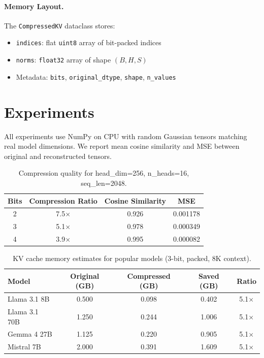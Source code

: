 \documentclass{article}
\begin{document}
\paragraph{Memory Layout.}
The \texttt{CompressedKV} dataclass stores:
\begin{itemize}
  \item \texttt{indices}: flat \texttt{uint8} array of bit-packed indices
  \item \texttt{norms}: \texttt{float32} array of shape $(B, H, S)$
  \item Metadata: \texttt{bits}, \texttt{original\_dtype}, \texttt{shape},
    \texttt{n\_values}
\end{itemize}

\section{Experiments}
\label{sec:experiments}

All experiments use NumPy on CPU with random Gaussian tensors matching
real model dimensions.  We report mean cosine similarity and MSE between
original and reconstructed tensors.

\begin{table}[h]
\centering
\caption{Compression quality for head\_dim=256, n\_heads=16, seq\_len=2048.}
\label{tab:quality}
\begin{tabular}{@{}cccc@{}}
\toprule
Bits & Compression Ratio & Cosine Similarity & MSE \\
\midrule
2 & 7.5$\times$ & 0.926 & 0.001178 \\
3 & 5.1$\times$ & 0.978 & 0.000349 \\
4 & 3.9$\times$ & 0.995 & 0.000082 \\
\bottomrule
\end{tabular}
\end{table}

\begin{table}[h]
\centering
\caption{KV cache memory estimates for popular models (3-bit, packed, 8K context).}
\label{tab:memory}
\begin{tabular}{@{}lcccc@{}}
\toprule
Model & Original (GB) & Compressed (GB) & Saved (GB) & Ratio \\
\midrule
Llama 3.1 8B   & 0.500 & 0.098 & 0.402 & 5.1$\times$ \\
Llama 3.1 70B  & 1.250 & 0.244 & 1.006 & 5.1$\times$ \\
Gemma 4 27B    & 1.125 & 0.220 & 0.905 & 5.1$\times$ \\
Mistral 7B     & 2.000 & 0.391 & 1.609 & 5.1$\times$ \\
\bottomrule
\end{tabular}
\end{table}
\end{document}
